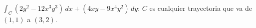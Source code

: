 \item $\int_C (2y^2 - 12x^3y^3) \, dx + (4xy - 9x^4y^2) \, dy$; $C$ es cualquier trayectoria que va de $(1, 1)$ a $(3, 2)$.
